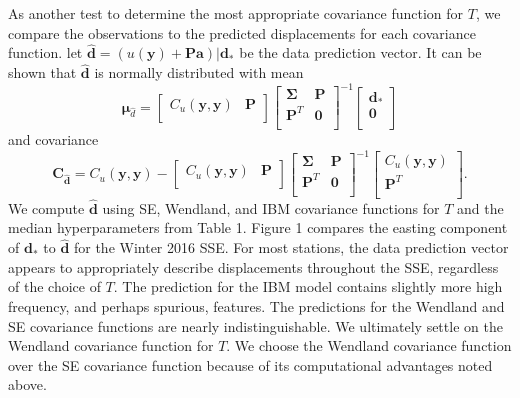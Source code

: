 \documentclass[10pt,a4paper]{article}
\begin{document}
As another test to determine the most appropriate covariance function for $T$, we compare the observations to the predicted displacements for each covariance function. let $\hat{\bm{d}} = \left(u(\bm{y}) + \bm{P}\bm{a}\right)|\bm{d}_*$ be the data prediction vector. It can be shown that $\hat{\bm{d}}$ is normally distributed with mean 
\begin{equation}\label{eq:DataPredMean}
\bm{\mu}_{\hat{d}} =
\left[ 
\begin{array}{cc}
C_u(\bm{y},\bm{y}) & \bm{P} \\
\end{array}
\right]
\left[
\begin{array}{cc}
\bm{\Sigma} & \bm{P} \\
\bm{P}^T  & \bm{0} \\
\end{array}
\right]^{-1}
\left[
\begin{array}{c}
\bm{d}_* \\
\bm{0} \\
\end{array}
\right]
\end{equation}  
and covariance
\begin{equation}\label{eq:DataPredCov}
\bm{C}_{\hat{\bm{d}}} = 
C_u(\bm{y},\bm{y}) - 
\left[ 
\begin{array}{cc}
C_u(\bm{y},\bm{y}) & \bm{P} \\
\end{array}
\right]
\left[
\begin{array}{cc}
\bm{\Sigma} & \bm{P} \\
\bm{P}^T  & \bm{0} \\
\end{array}
\right]^{-1}
\left[
\begin{array}{c}
C_u(\bm{y},\bm{y}) \\
\bm{P}^T \\
\end{array}
\right].
\end{equation}
We compute $\hat{\bm{d}}$ using SE, Wendland, and IBM covariance functions for $T$ and the median hyperparameters from Table 1. Figure 1 compares the easting component of $\bm{d}_*$ to $\hat{\bm{d}}$ for the Winter 2016 SSE.  For most stations, the data prediction vector appears to appropriately describe displacements throughout the SSE, regardless of the choice of $T$. The prediction for the IBM model contains slightly more high frequency, and perhaps spurious, features. The predictions for the Wendland and SE covariance functions are nearly indistinguishable. We ultimately settle on the Wendland covariance function for $T$. We choose the Wendland covariance function over the SE covariance function because of its computational advantages noted above.     
\end{document}
